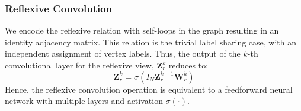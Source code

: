 \subsubsection{Reflexive Convolution}
\label{subsubsec:reflex}
We encode the reflexive relation with self-loops in the graph resulting in an identity adjacency matrix. This relation is the trivial label sharing case, with an independent assignment of vertex labels. Thus, the output of the $k$-th convolutional layer for the reflexive view, $\mathbf{Z}_r^{k}$ reduces to:
\begin{equation}
  \label{eq:reflexive}
  \mathbf{Z}_r^{k} = \sigma \left( I_N \mathbf{Z}_r^{k-1} \mathbf{W}_r^{k} \right)
\end{equation}
Hence, the reflexive convolution operation is equivalent to a feedforward neural network with multiple layers and activation $\sigma( \cdot )$.

